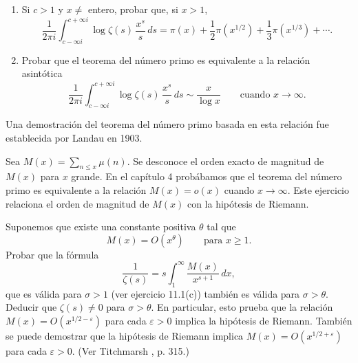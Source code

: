    \begin{ejercicio}
        \begin{enumerate}
            \item[(a)] Si $c>1$ y $x\neq$ entero, probar que, si $x>1$,
            \begin{equation*}
                \frac{1}{2\pi i}\int_{c-\infty i}^{c+\infty i}\log\zeta(s)\,\frac{x^s}{s}\,ds=\pi(x)+\frac{1}{2}\pi(x^{1/2})+\frac{1}{3}\pi(x^{1/3})+\cdots.
            \end{equation*}
            \item[(b)] Probar que el teorema del número primo es equivalente a la relación
            asintótica
            \begin{equation*}
                \frac{1}{2\pi i}\int_{c-\infty i}^{c+\infty i}\log\zeta(s)\,\frac{x^s}{s}\,ds\sim\frac{x}{\log x}\qquad\text{cuando }x\to\infty.
            \end{equation*}
        \end{enumerate}
        Una demostración del teorema del número primo basada en esta relación fue establecida
        por Landau en 1903.
    \end{ejercicio}

    \begin{ejercicio}
        Sea $M(x)=\sum_{n\leq x}\mu(n)$. Se desconoce el orden exacto de magnitud de $M(x)$ para
        $x$ grande. En el capítulo 4 probábamos que el teorema del número primo es equivalente a
        la relación $M(x)=o(x)$ cuando $x\to\infty$. Este ejercicio relaciona el orden de
        magnitud de $M(x)$ con la hipótesis de Riemann.

        Suponemos que existe una constante positiva $\theta$ tal que
        \begin{equation*}
            M(x)=O(x^{\theta})\qquad\text{para }x\geq1.
        \end{equation*}
        Probar que la fórmula
        \begin{equation*}
            \frac{1}{\zeta(s)}=s\int_1^{\infty}\frac{M(x)}{x^{s+1}}\,dx,
        \end{equation*}
        que es válida para $\sigma>1$ (ver ejercicio 11.1(c)) también es válida para
        $\sigma>\theta$. Deducir que $\zeta(s)\neq0$ para $\sigma>\theta$. En particular, esto
        prueba que la relación $M(x)=O(x^{1/2-\varepsilon})$ para cada $\varepsilon>0$ implica
        la hipótesis de Riemann. También se puede demostrar que la hipótesis de Riemann implica
        $M(x)=O(x^{1/2+\varepsilon})$ para cada $\varepsilon>0$. (Ver Titchmarsh
        \cite{titchmarsh1951}, p. 315.)
    \end{ejercicio}

